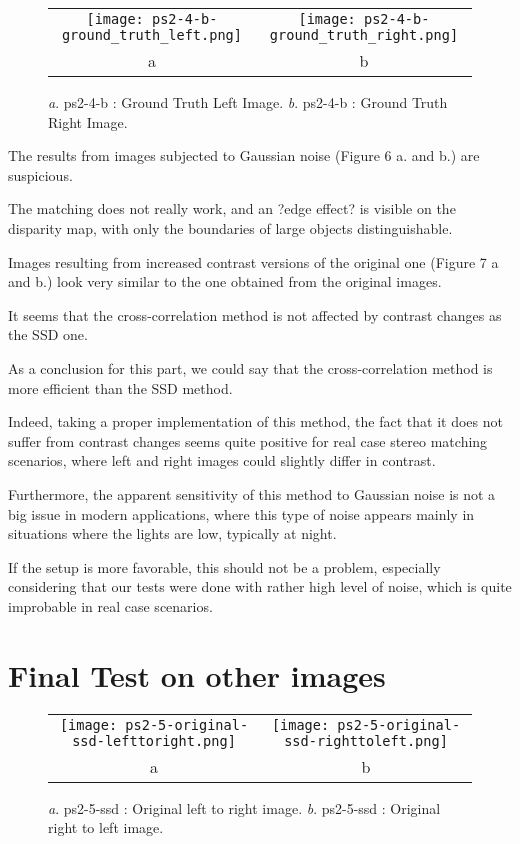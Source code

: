 \documentclass[a4paper,11pt]{article}
\begin{document}
 \begin{figure}[H]
\begin{center}
\begin{tabular}{cc}
	\texttt{[image: ps2-4-b-ground\_truth\_left.png]}&
	\texttt{[image: ps2-4-b-ground\_truth\_right.png]}\\
	a&b
\end{tabular}
\end{center}
\caption{ 
\textit{a}. ps2-4-b : Ground Truth Left Image.  \textit{b}. ps2-4-b : Ground Truth Right Image. }
\label{ps2-1}
\end{figure}


The results from images subjected to Gaussian noise (Figure 6 a. and b.) are suspicious.

The matching does not really work, and an ?edge effect? is visible on the disparity map, with only the boundaries of large objects distinguishable.

Images resulting from increased contrast versions of the original one (Figure 7 a and b.) look very similar to the one obtained from the original images.

It seems that  the cross-correlation method is not affected by contrast changes as the SSD one.

As a conclusion for this part, we could say that the cross-correlation method is more efficient than the SSD method.

Indeed, taking a proper implementation of this method, the fact that it does not suffer from contrast changes seems quite positive for real case stereo matching scenarios, where left and right images could slightly differ in contrast.

Furthermore, the apparent sensitivity of this method to Gaussian noise is not a big issue in modern applications, where this type of noise appears mainly in situations where the lights are low, typically at night.

If the setup is more favorable, this should not be a problem, especially considering that our tests were done with rather high level of noise, which is quite improbable in real case scenarios.

\section{Final Test on other images}


 \begin{figure}[H]
\begin{center}
\begin{tabular}{cc}
	\texttt{[image: ps2-5-original-ssd-lefttoright.png]}&
	\texttt{[image: ps2-5-original-ssd-righttoleft.png]}\\
	a&b
\end{tabular}
\end{center}
\caption{ 
\textit{a}. ps2-5-ssd : Original left to right image.  \textit{b}. ps2-5-ssd : Original right to left image. }
\label{ps2-1}
\end{figure}
\end{document}
